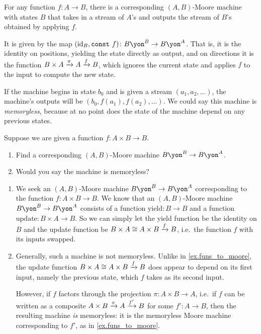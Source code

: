 \documentclass[Book-Poly]{subfiles}
\begin{document}
\begin{example}\label{ex.funs_to_moore}
For any function $f\colon A\to B$, there is a corresponding $(A,B)$-Moore machine with states $B$ that takes in a stream of $A$'s and outputs the stream of $B$'s obtained by applying $f$. 

It is given by the map $(\id_B,\texttt{const} \ f)\colon B\yon^B\to B\yon^A$. That is, it is the identity on positions, yielding the state directly as output, and on directions it is the function $B\times A\xrightarrow{\pi}A\xrightarrow{f} B$, which ignores the current state and applies $f$ to the input to compute the new state.

If the machine begins in state $b_0$ and is given a stream $(a_1,a_2,\ldots)$, the machine's outputs will be $(b_0,f(a_1),f(a_2),\ldots)$. We could say this machine is \emph{memoryless}, because at no point does the state of the machine depend on any previous states.
\end{example}

\begin{exercise}\label{exc.funs_to_moore}
Suppose we are given a function $f\colon A\times B\to B$.
\begin{enumerate}
	\item Find a corresponding $(A,B)$-Moore machine $B\yon^B\to B\yon^A$.
	\item Would you say the machine is memoryless?
\qedhere
\end{enumerate}
\begin{solution}
\begin{enumerate}
    \item We seek an $(A,B)$-Moore machine $B\yon^B\to B\yon^A$ corresponding to the function $f\colon A\times B\to B$.
    We know that an $(A,B)$-Moore machine $B\yon^B \to B\yon^A$ consists of a function $\text{yield} \colon B \to B$ and a function $\text{update} \colon B \times A \to B$.
    So we can simply let the yield function be the identity on $B$ and the update function be $B \times A \cong A \times B \xrightarrow{f} B$, i.e.\ the function $f$ with its inputs swapped.
    
    \item Generally, such a machine is not memoryless.
    Unlike in \cref{ex.funs_to_moore}, the update function $B \times A \cong A \times B \xrightarrow{f} B$ does appear to depend on its first input, namely the previous state, which $f$ takes as its second input.
    
    However, if $f$ factors through the projection $\pi \colon A \times B \to A$, i.e.\ if $f$ can be written as a composite $A \times B \xrightarrow{\pi} A \xrightarrow{f'} B$ for some $f' \colon A \to B$, then the resulting machine \emph{is} memoryless: it is the memoryless Moore machine corresponding to $f'$, as in \cref{ex.funs_to_moore}.
\end{enumerate}
\end{solution}
\end{exercise}
\end{document}
